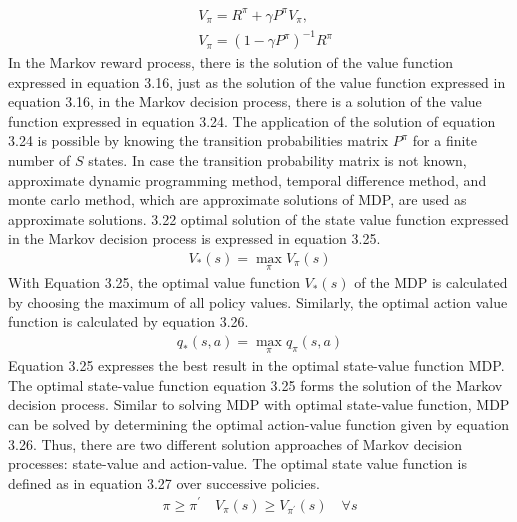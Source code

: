\documentclass[12pt,twoside,a4]{mwbk}
\begin{document}
\begin{subequations}
\begin{align}
   &V_{\pi}=R^{\pi}+\gamma P^{\pi} V_{\pi}, \\
   &V_{\pi}=\left(1-\gamma P^{\pi}\right)^{-1} R^{\pi}
\end{align}
\end{subequations}
In the Markov reward process, there is the solution of the value function expressed in equation 3.16, just as the solution of the value function expressed in equation 3.16, in the Markov decision process, there is a solution of the value function expressed in equation 3.24. The application of the solution of equation 3.24 is possible by knowing the transition probabilities matrix $P^{\pi}$ for a finite number of $S$ states. In case the transition probability matrix is not known, approximate dynamic programming method, temporal difference method, and monte carlo method, which are approximate solutions of MDP, are used as approximate solutions. 3.22 optimal solution of the state value function expressed in the Markov decision process is expressed in equation 3.25.
\begin{subequations}
\begin{align}
   V_{*}(s)=\max _{\pi} V_{\pi}(s)
\end{align}
\end{subequations}
With Equation 3.25, the optimal value function $V_{*}(s)$ of the MDP is calculated by choosing the maximum of all policy values. Similarly, the optimal action value function is calculated by equation 3.26.
\begin{subequations}
\begin{align}
   q_{*}(s, a)=\max _{\pi} q_{\pi}(s, a)
\end{align}
\end{subequations}
Equation 3.25 expresses the best result in the optimal state-value function MDP. The optimal state-value function equation 3.25 forms the solution of the Markov decision process. Similar to solving MDP with optimal state-value function, MDP can be solved by determining the optimal action-value function given by equation 3.26. Thus, there are two different solution approaches of Markov decision processes: state-value and action-value. The optimal state value function is defined as in equation 3.27 over successive policies.
\begin{subequations}
\begin{align}
   \pi \geq \pi^{\prime} \quad V_{\pi}(s) \geq V_{\pi^{\prime}}(s) \quad \forall s
\end{align}
\end{subequations}
\end{document}
